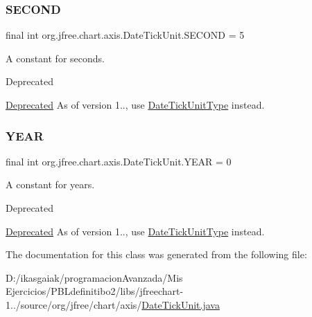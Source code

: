 \subsubsection{\texorpdfstring{S\+E\+C\+O\+ND}{SECOND}}
{\footnotesize\ttfamily final int org.\+jfree.\+chart.\+axis.\+Date\+Tick\+Unit.\+S\+E\+C\+O\+ND = 5\hspace{0.3cm}{\ttfamily [static]}}

A constant for seconds.

\begin{DoxyRefDesc}{Deprecated}
\item[\mbox{\hyperlink{deprecated__deprecated000011}{Deprecated}}]As of version 1.., use \mbox{\hyperlink{classorg_1_1jfree_1_1chart_1_1axis_1_1_date_tick_unit_type}{Date\+Tick\+Unit\+Type}} instead. \end{DoxyRefDesc}
\mbox{\label{classorg_1_1jfree_1_1chart_1_1axis_1_1_date_tick_unit_a95a5f9f2c3c0b99f4c6cd309cd5e6079}} 
\subsubsection{\texorpdfstring{Y\+E\+AR}{YEAR}}
{\footnotesize\ttfamily final int org.\+jfree.\+chart.\+axis.\+Date\+Tick\+Unit.\+Y\+E\+AR = 0\hspace{0.3cm}{\ttfamily [static]}}

A constant for years.

\begin{DoxyRefDesc}{Deprecated}
\item[\mbox{\hyperlink{deprecated__deprecated000006}{Deprecated}}]As of version 1.., use \mbox{\hyperlink{classorg_1_1jfree_1_1chart_1_1axis_1_1_date_tick_unit_type}{Date\+Tick\+Unit\+Type}} instead. \end{DoxyRefDesc}


The documentation for this class was generated from the following file\+:\begin{DoxyCompactItemize}
\item 
D\+:/ikasgaiak/programacion\+Avanzada/\+Mis Ejercicios/\+P\+B\+Ldefinitibo2/libs/jfreechart-\/1../source/org/jfree/chart/axis/\mbox{\hyperlink{_date_tick_unit_8java}{Date\+Tick\+Unit.\+java}}\end{DoxyCompactItemize}
